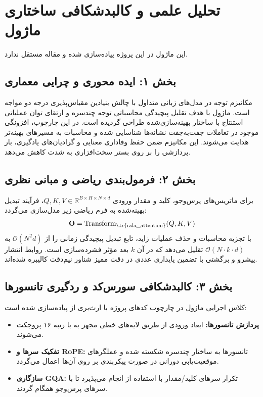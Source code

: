 \section{تحلیل علمی و کالبدشکافی ساختاری ماژول }

این ماژول در این پروژه پیاده‌سازی شده و مقاله مستقل ندارد.
\label{sec:rala_attention}

\subsection*{بخش ۱: ایده محوری و چرایی معماری }
مکانیزم توجه در مدل‌های زبانی متداول با چالش بنیادین مقیاس‌پذیری درجه دو مواجه است. ماژول  با هدف تقلیل پیچیدگی محاسباتی توجه چندسره و ارتقای توان عملیاتی استنتاج با ساختار بهینه‌سازی‌شده طراحی گردیده است. در این چارچوب، افزونگی موجود در تعاملات جفت‌به‌جفت نشانه‌ها شناسایی شده و محاسبات به مسیرهای بهینه‌تر هدایت می‌شوند. این مکانیزم ضمن حفظ وفاداری معنایی و گرادیان‌های یادگیری، بار پردازشی را بر روی بستر سخت‌افزاری به شدت کاهش می‌دهد.

\subsection*{بخش ۲: فرمول‌بندی ریاضی و مبانی نظری }
برای ماتریس‌های پرس‌وجو، کلید و مقدار ورودی $Q, K, V \in \mathbb{R}^{B \times H \times N \times d}$، فرآیند تبدیل بهینه‌شده به فرم ریاضی زیر مدل‌سازی می‌گردد:
\begin{equation}
\mathbf{O} = \operatorname{Transform}_{\text{\lr{rala\_attention}}}(Q, K, V)
\end{equation}
با تجزیه محاسبات و حذف عملیات زاید، تابع تبدیل پیچیدگی زمانی را از $\mathcal{O}(N^2 d)$ به $\mathcal{O}(N \cdot k \cdot d)$ تقلیل می‌دهد که در آن $k$ بعد مؤثر فشرده‌سازی است. روابط انتشار پیشرو و برگشتی با تضمین پایداری عددی در دقت ممیز شناور نیم‌دقت  کالیبره شده‌اند.

\subsection*{بخش ۳: کالبدشکافی سورس‌کد و ردگیری تانسورها }
کلاس اجرایی ماژول در چارچوب کدهای پروژه با ارث‌بری از  پیاده‌سازی شده است:
\begin{itemize}
    \item \textbf{پردازش تانسورها:} ابعاد ورودی \lr{$[B, N, D]$} از طریق لایه‌های خطی مجهز به  با رتبه ۱۶ پروجکت می‌شوند.
    \item \textbf{تفکیک سرها و RoPE:} تانسورها به ساختار چندسره \lr{$[B, H, N, d]$} شکسته شده و عملگرهای موقعیت‌یابی دورانی در صورت پیکربندی بر روی آن‌ها اعمال می‌گردد.
    \item \textbf{سازگاری GQA:} تکرار سرهای کلید/مقدار با استفاده از  انجام می‌پذیرد تا با سرهای پرس‌وجو همگام گردند.
\end{itemize}

